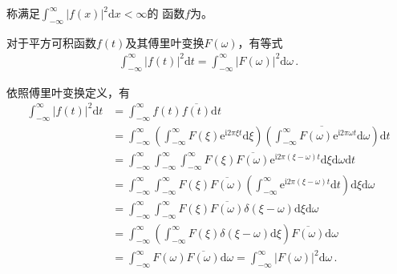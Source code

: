 \begin{definition}
    称满足$\displaystyle\int_{-\infty}^{\infty}|f(x)|^2\mathrm{d}x<\infty$的
    函数$f$为。
\end{definition}
\begin{theorem}
    对于平方可积函数$f(t)$及其傅里叶变换$F(\omega)$，有等式
    \begin{align}
        \int_{-\infty}^{\infty}|f(t)|^2\mathrm{d}t=\int_{-\infty}^{\infty}|F(\omega)|^2\mathrm{d}\omega\, .
    \end{align}
\end{theorem}
\begin{prove}
    依照傅里叶变换定义，有
    \begin{align}
        \int_{-\infty}^{\infty}|f(t)|^2\mathrm{d}t & =\int_{-\infty}^{\infty}f(t)\overline{f(t)}\mathrm{d}t\nonumber                                                                                                                                                                                \\
                                                   & =\int_{-\infty}^{\infty}\left(\int_{-\infty}^{\infty}F(\xi)\mathrm{e}^{\mathrm{i}2\pi\xi t}\mathrm{d}\xi\right)\left(\overline{\int_{-\infty}^{\infty}F(\omega)\mathrm{e}^{\mathrm{i}2\pi\omega t}\mathrm{d}\omega}\right)\mathrm{d}t\nonumber \\
                                                   & =\int_{-\infty}^{\infty}\int_{-\infty}^{\infty}\int_{-\infty}^{\infty}F(\xi)\overline{F(\omega)}\mathrm{e}^{\mathrm{i}2\pi(\xi-\omega) t}\mathrm{d}\xi\mathrm{d}\omega\mathrm{d}t\nonumber                                                     \\
                                                   & =\int_{-\infty}^{\infty}\int_{-\infty}^{\infty}F(\xi)\overline{F(\omega)}\left(\int_{-\infty}^{\infty}\mathrm{e}^{\mathrm{i}2\pi(\xi-\omega) t}\mathrm{d}t\right)\mathrm{d}\xi\mathrm{d}\omega\nonumber                                        \\
                                                   & =\int_{-\infty}^{\infty}\int_{-\infty}^{\infty}F(\xi)\overline{F(\omega)}\delta(\xi-\omega)\mathrm{d}\xi\mathrm{d}\omega\nonumber                                                                                                              \\
                                                   & =\int_{-\infty}^{\infty}\left(\int_{-\infty}^{\infty}F(\xi)\delta(\xi-\omega)\mathrm{d}\xi\right)\overline{F(\omega)}\mathrm{d}\omega\nonumber                                                                                                 \\
                                                   & =\int_{-\infty}^{\infty}F(\omega)\overline{F(\omega)}\mathrm{d}\omega=\int_{-\infty}^{\infty}|F(\omega)|^2\mathrm{d}\omega\, .
    \end{align}
\end{prove}

